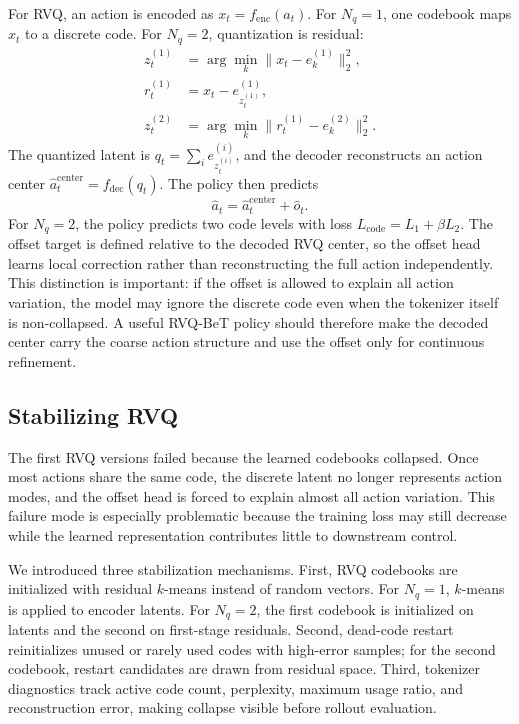 \documentclass[conference]{IEEEtran}
\begin{document}
For RVQ, an action is encoded as $x_t=f_{\mathrm{enc}}(a_t)$. For $N_q{=}1$, one codebook maps $x_t$ to a discrete code. For $N_q{=}2$, quantization is residual:
\begin{align}
 z_t^{(1)} &= \arg\min_k \|x_t-e_k^{(1)}\|_2^2, \\
 r_t^{(1)} &= x_t-e_{z_t^{(1)}}^{(1)}, \\
 z_t^{(2)} &= \arg\min_k \|r_t^{(1)}-e_k^{(2)}\|_2^2.
\end{align}
The quantized latent is $q_t=\sum_i e_{z_t^{(i)}}^{(i)}$, and the decoder reconstructs an action center $\hat{a}^{\mathrm{center}}_t=f_{\mathrm{dec}}(q_t)$. The policy then predicts
\begin{equation}
\hat{a}_t = \hat{a}^{\mathrm{center}}_t + \hat{o}_t.
\end{equation}
For $N_q{=}2$, the policy predicts two code levels with loss $L_{\mathrm{code}}=L_1+\beta L_2$. The offset target is defined relative to the decoded RVQ center, so the offset head learns local correction rather than reconstructing the full action independently. This distinction is important: if the offset is allowed to explain all action variation, the model may ignore the discrete code even when the tokenizer itself is non-collapsed. A useful RVQ-BeT policy should therefore make the decoded center carry the coarse action structure and use the offset only for continuous refinement.

\subsection{Stabilizing RVQ}

The first RVQ versions failed because the learned codebooks collapsed. Once most actions share the same code, the discrete latent no longer represents action modes, and the offset head is forced to explain almost all action variation. This failure mode is especially problematic because the training loss may still decrease while the learned representation contributes little to downstream control.

We introduced three stabilization mechanisms. First, RVQ codebooks are initialized with residual $k$-means instead of random vectors. For $N_q{=}1$, $k$-means is applied to encoder latents. For $N_q{=}2$, the first codebook is initialized on latents and the second on first-stage residuals. Second, dead-code restart reinitializes unused or rarely used codes with high-error samples; for the second codebook, restart candidates are drawn from residual space. Third, tokenizer diagnostics track active code count, perplexity, maximum usage ratio, and reconstruction error, making collapse visible before rollout evaluation.
\end{document}
